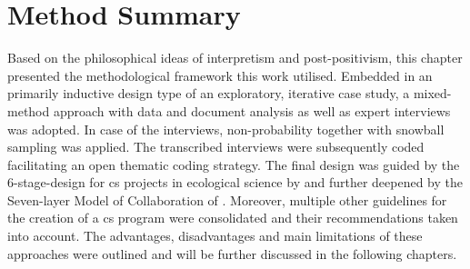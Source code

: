 
\section{Method Summary}

Based on the philosophical ideas of interpretism and post-positivism, this chapter presented the methodological framework this work utilised. Embedded in an primarily inductive design type of an exploratory, iterative case study, a mixed-method approach with data and document analysis as well as expert interviews was adopted. In case of the interviews, non-probability together with snowball sampling was applied. The transcribed interviews were subsequently coded facilitating an open thematic coding strategy. The final design was guided by the 6-stage-design for \acrlong*{cs} projects in ecological science by \autocite{fraislCitizenScienceEnvironmental2022} and further deepened by the Seven-layer Model of Collaboration of \autocite{briggsSevenLayerModelCollaboration}. Moreover, multiple other guidelines for the creation of a \acrshort*{cs} program were consolidated and their recommendations taken into account.\newline
The advantages, disadvantages and main limitations of these approaches were outlined and will be further discussed in the following chapters.




